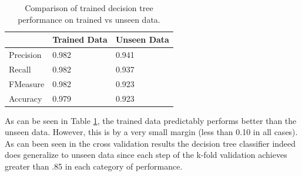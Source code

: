 \documentclass[letterpaper,12pt]{article}
\begin{document}
\begin{table}[H]
  \centering

  \begin{tabular}{l|l|l|}
\cline{2-3}
                                & \textbf{Trained Data} & \textbf{Unseen Data} \\ \hline
\multicolumn{1}{|l|}{Precision} & 0.982                 & 0.941                \\ \hline
\multicolumn{1}{|l|}{Recall}    & 0.982                 & 0.937                \\ \hline
\multicolumn{1}{|l|}{FMeasure}  & 0.982                 & 0.923                \\ \hline
\multicolumn{1}{|l|}{Accuracy}  & 0.979                 & 0.923                \\ \hline
\end{tabular}
\caption{Comparison of trained decision tree performance on trained vs unseen data.}
\label{table:overfitting}
\end{table}

As can be seen in  Table \ref{table:overfitting}, the trained data predictably performs better than the unseen data. However, this is by a very small margin (less than 0.10 in all cases). As can been seen in the cross validation results the decision tree classifier indeed does generalize to unseen data since each step of the k-fold validation achieves greater than .85 in each category of performance. 



\end{document}
